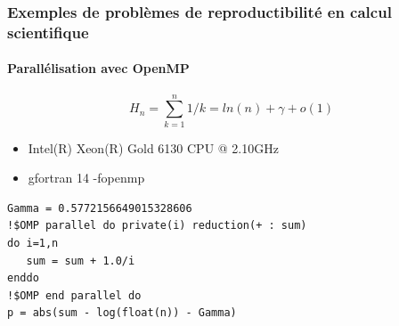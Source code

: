 \begin{frame}[fragile]

\frametitle{Exemples de problèmes de reproductibilité en calcul scientifique}
\framesubtitle{Parallélisation avec OpenMP}
\vspace{-0.25cm}
  $$H_n = \sum_{k=1}^n 1/k = ln(n) + \gamma +o(1)$$
\begin{itemize}
\item Intel(R) Xeon(R) Gold 6130 CPU @ 2.10GHz 
\item gfortran 14 -fopenmp 
\end{itemize}

\begin{verbatim}
Gamma = 0.5772156649015328606
!$OMP parallel do private(i) reduction(+ : sum)
do i=1,n
   sum = sum + 1.0/i
enddo
!$OMP end parallel do 
p = abs(sum - log(float(n)) - Gamma)
\end{verbatim}
\end{frame}



